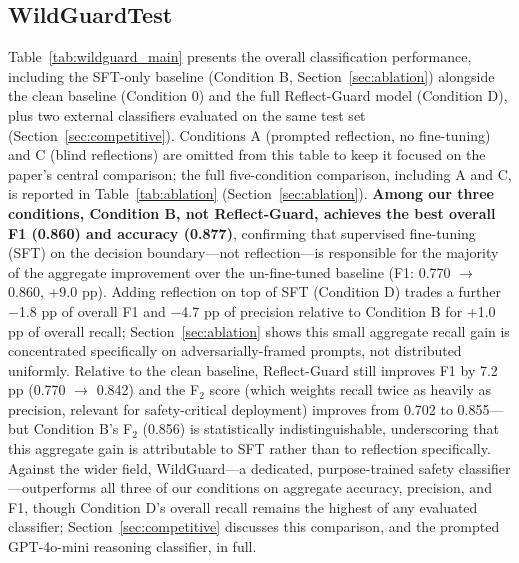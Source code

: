 \documentclass[superintelligence,article,submit,pdftex,moreauthors]{Definitions/mdpi}
\begin{document}
\subsection{WildGuardTest}

Table~\ref{tab:wildguard_main} presents the overall classification performance, including the SFT-only baseline (Condition B, Section~\ref{sec:ablation}) alongside the clean baseline (Condition 0) and the full Reflect-Guard model (Condition D), plus two external classifiers evaluated on the same test set (Section~\ref{sec:competitive}). Conditions A (prompted reflection, no fine-tuning) and C (blind reflections) are omitted from this table to keep it focused on the paper's central comparison; the full five-condition comparison, including A and C, is reported in Table~\ref{tab:ablation} (Section~\ref{sec:ablation}). \textbf{Among our three conditions, Condition B, not Reflect-Guard, achieves the best overall F1 (0.860) and accuracy (0.877)}, confirming that supervised fine-tuning (SFT) on the decision boundary---not reflection---is responsible for the majority of the aggregate improvement over the un-fine-tuned baseline (F1: 0.770 $\to$ 0.860, +9.0 pp). Adding reflection on top of SFT (Condition D) trades a further $-$1.8 pp of overall F1 and $-$4.7 pp of precision relative to Condition B for +1.0 pp of overall recall; Section~\ref{sec:ablation} shows this small aggregate recall gain is concentrated specifically on adversarially-framed prompts, not distributed uniformly. Relative to the clean baseline, Reflect-Guard still improves F1 by 7.2 pp (0.770 $\to$ 0.842) and the F$_2$ score (which weights recall twice as heavily as precision, relevant for safety-critical deployment) improves from 0.702 to 0.855---but Condition B's F$_2$ (0.856) is statistically indistinguishable, underscoring that this aggregate gain is attributable to SFT rather than to reflection specifically. Against the wider field, WildGuard---a dedicated, purpose-trained safety classifier---outperforms all three of our conditions on aggregate accuracy, precision, and F1, though Condition D's overall recall remains the highest of any evaluated classifier; Section~\ref{sec:competitive} discusses this comparison, and the prompted GPT-4o-mini reasoning classifier, in full.
\end{document}
